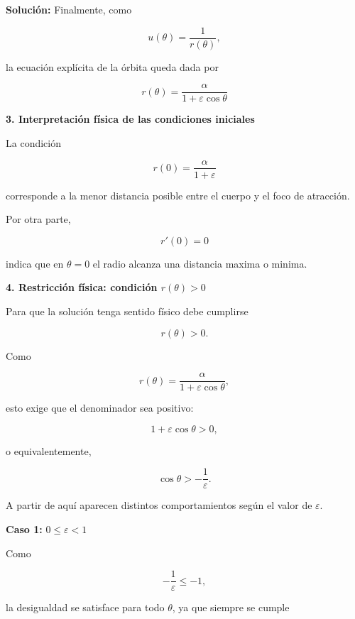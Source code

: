 \documentclass[10pt,a4paper]{article}
\newenvironment{solution}{\par\noindent\textbf{Solución: } }{}
\begin{document}
\begin{solution}
Finalmente, como

\[
u(\theta)=\frac{1}{r(\theta)},
\]

la ecuación explícita de la órbita queda dada por

\[
\boxed{
r(\theta)
=
\frac{\alpha}{1+\varepsilon\cos\theta}
}
\]

\vspace{0.4cm}

\noindent
\textbf{\large 3. Interpretación física de las condiciones iniciales}

\vspace{0.2cm}

La condición

\[
r(0)=\frac{\alpha}{1+\varepsilon}
\]

corresponde a la menor distancia posible entre el cuerpo y el foco de atracción.

Por otra parte,

\[
r'(0)=0
\]

indica que en $\theta=0$ el radio alcanza una distancia maxima o minima.

\vspace{0.4cm}

\noindent
\textbf{\large 4. Restricción física: condición $r(\theta)>0$}

\vspace{0.2cm}

Para que la solución tenga sentido físico debe cumplirse

\[
r(\theta)>0.
\]

Como

\[
r(\theta)
=
\frac{\alpha}{1+\varepsilon\cos\theta},
\]

esto exige que el denominador sea positivo:

\[
1+\varepsilon\cos\theta>0,
\]

o equivalentemente,

\[
\cos\theta>-\frac{1}{\varepsilon}.
\]

A partir de aquí aparecen distintos comportamientos según el valor de $\varepsilon$.

\vspace{0.3cm}

\noindent
\textbf{Caso 1:} \(0 \leq \varepsilon < 1\)

\vspace{0.2cm}

Como

\[
-\frac{1}{\varepsilon}\leq -1,
\]

la desigualdad se satisface para todo \(\theta\), ya que siempre se cumple


\end{solution}
\end{document}
